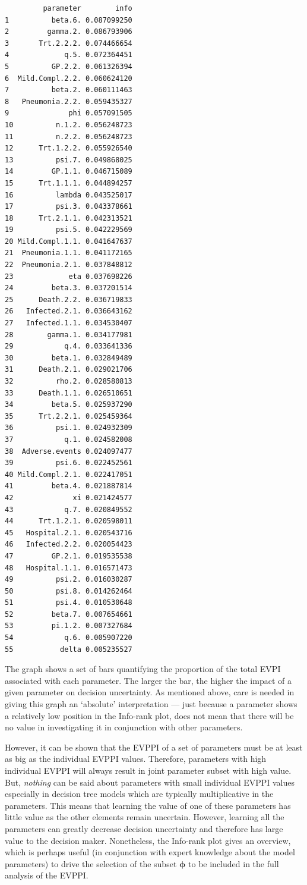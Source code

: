 \documentclass[]{article}
\begin{document}
\begin{verbatim}
         parameter        info
1          beta.6. 0.087099250
2         gamma.2. 0.086793906
3       Trt.2.2.2. 0.074466654
4             q.5. 0.072364451
5          GP.2.2. 0.061326394
6  Mild.Compl.2.2. 0.060624120
7          beta.2. 0.060111463
8   Pneumonia.2.2. 0.059435327
9              phi 0.057091505
10          n.1.2. 0.056248723
11          n.2.2. 0.056248723
12      Trt.1.2.2. 0.055926540
13          psi.7. 0.049868025
14         GP.1.1. 0.046715089
15      Trt.1.1.1. 0.044894257
16          lambda 0.043525017
17          psi.3. 0.043378661
18      Trt.2.1.1. 0.042313521
19          psi.5. 0.042229569
20 Mild.Compl.1.1. 0.041647637
21  Pneumonia.1.1. 0.041172165
22  Pneumonia.2.1. 0.037848812
23             eta 0.037698226
24         beta.3. 0.037201514
25      Death.2.2. 0.036719833
26   Infected.2.1. 0.036643162
27   Infected.1.1. 0.034530407
28        gamma.1. 0.034177981
29            q.4. 0.033641336
30         beta.1. 0.032849489
31      Death.2.1. 0.029021706
32          rho.2. 0.028580813
33      Death.1.1. 0.026510651
34         beta.5. 0.025937290
35      Trt.2.2.1. 0.025459364
36          psi.1. 0.024932309
37            q.1. 0.024582008
38  Adverse.events 0.024097477
39          psi.6. 0.022452561
40 Mild.Compl.2.1. 0.022417051
41         beta.4. 0.021887814
42              xi 0.021424577
43            q.7. 0.020849552
44      Trt.1.2.1. 0.020598011
45   Hospital.2.1. 0.020543716
46   Infected.2.2. 0.020054423
47         GP.2.1. 0.019535538
48   Hospital.1.1. 0.016571473
49          psi.2. 0.016030287
50          psi.8. 0.014262464
51          psi.4. 0.010530648
52         beta.7. 0.007654661
53         pi.1.2. 0.007327684
54            q.6. 0.005907220
55           delta 0.005235527
\end{verbatim}

The graph shows a set of bars quantifying the proportion of the total
EVPI associated with each parameter. The larger the bar, the higher the
impact of a given parameter on decision uncertainty. As mentioned above,
care is needed in giving this graph an `absolute' interpretation ---
just because a parameter shows a relatively low position in the
Info-rank plot, does not mean that there will be no value in
investigating it in conjunction with other parameters.

However, it can be shown that the EVPPI of a set of parameters must be
at least as big as the individual EVPPI values. Therefore, parameters
with high individual EVPPI will always result in joint parameter subset
with high value. But, \emph{nothing} can be said about parameters with
small individual EVPPI values especially in decision tree models which
are typically multiplicative in the parameters. This means that learning
the value of one of these parameters has little value as the other
elements remain uncertain. However, learning all the parameters can
greatly decrease decision uncertainty and therefore has large value to
the decision maker. Nonetheless, the Info-rank plot gives an overview,
which is perhaps useful (in conjunction with expert knowledge about the
model parameters) to drive the selection of the subset \(\bm\phi\) to be
included in the full analysis of the EVPPI.
\end{document}
